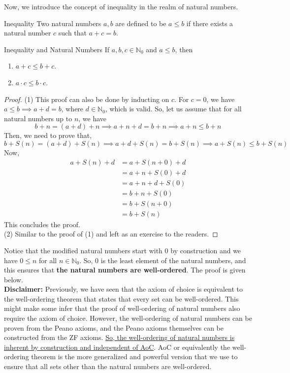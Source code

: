 \noindent Now, we introduce the concept of inequality in the realm of natural numbers.
\begin{Definition}{Inequality}\label{inequality_natural}
	Two natural numbers $a, b$ are defined to be $a\leq b$ if there exists a natural number $c$ such that $a+c=b$.
\end{Definition}
\begin{Theorem}{Inequality and Natural Numbers}\label{inequality_theorem_natural_number}
	If $a,b,c\in\mathbb{N}_0$ and $a\leq b$, then
	\begin{enumerate}
		\item $a+c\leq b+c$.
		\item $a\cdot c\leq b\cdot c$.
	\end{enumerate}
\end{Theorem}
\begin{proof}
	(1) This proof can also be done by inducting on $c$. For $c=0$, we have $a\leq b\implies a+d=b$, where $d\in\mathbb{N}_0$, which is valid. So, let us assume that for all natural numbers up to $n$, we have $$b+n=(a+d)+n\implies a+n+d=b+n\implies a+n\leq b+n$$ Then, we need to prove that, $$b+S(n)=(a+d)+S(n)\implies a+d+S(n)=b+S(n)\implies a+S(n)\leq b+S(n)$$ Now,
	\begin{align*}
		a+S(n)+d&=a+S(n+0)+d\\
		&=a+n+S(0)+d\\
		&=a+n+d+S(0)\\
		&=b+n+S(0)\\
		&=b+S(n+0)\\
		&=b+S(n)
	\end{align*}
	This concludes the proof.\\
	(2) Similar to the proof of (1) and left as an exercise to the readers.
\end{proof}
\noindent Notice that the modified natural numbers start with $0$ by construction and we have $0\leq n$ for all $n\in\mathbb{N}_0$. So, $0$ is the least element of the natural numbers, and this ensures that \textbf{the natural numbers are well-ordered}. The proof is given below.\\
\noindent\textbf{Disclaimer:} Previously, we have seen that the axiom of choice is equivalent to the well-ordering theorem that states that every set can be well-ordered. This might make some infer that the proof of well-ordering of natural numbers also require the axiom of choice. However, the well-ordering of natural numbers can be proven from the Peano axioms, and the Peano axioms themselves can be constructed from the ZF axioms. \underline{So, the well-ordering of natural numbers is inherent by construction and independent of AoC}. AoC or equivalently the well-ordering theorem is the more generalized and powerful version that we use to ensure that all sets other than the natural numbers are well-ordered.
